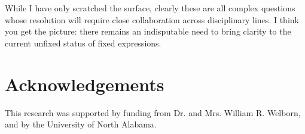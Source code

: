 \documentclass[output=paper]{langsci/langscibook}
\begin{document}
While I have only scratched the surface, clearly these are all complex questions whose resolution will require close collaboration across disciplinary lines. I think you get the picture: there remains an indisputable need to bring clarity to the current unfixed status of fixed expressions.

\section*{Acknowledgements}
This research was supported by funding from Dr. and Mrs. William R. Welborn, and by the University of North Alabama.

{\sloppy\printbibliography[heading=subbibliography,notkeyword=this]}
\end{document}
